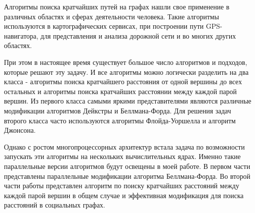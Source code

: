 \startprefacepage

Алгоритмы поиска кратчайших путей на графах нашли свое применение в различных областях и сферах деятельности человека. Такие алгоритмы используются в картографических сервисах, при построении пути GPS-навигатора, для представления и анализа дорожной сети и во многих других областях.
 
При этом в настоящее время существует большое число алгоритмов и подходов, которые решают эту задачу. И все алгоритмы можно логически разделить на два класса - алгоритмы поиска кратчайшего расстояния от одной вершины до всех остальных и алгоритмы поиска кратчайших расстоянии между каждой парой вершин. Из первого класса самыми яркими представителями являются различные модификации алгоритмов Дейкстры и Беллмана-Форда. Для решения задач второго класса часто используются алгоритмы Флойда-Уоршелла и алгоритм Джонсона. 

Однако с ростом многопроцессорных архитектур встала задача по возможности запускать эти алгоритмы на нескольких вычислительных ядрах. Именно такие параллельные версии алгоритмов будут освещены в моей работе. В первом части представлены параллельные модификации алгоритма Беллмана-Форда. Во второй части работы представлен алгоритм по поиску кратчайших расстояний между каждой парой вершин в общем случае и эффективная модификация для поиска расстояний в социальных графах.

\FloatBarrier
